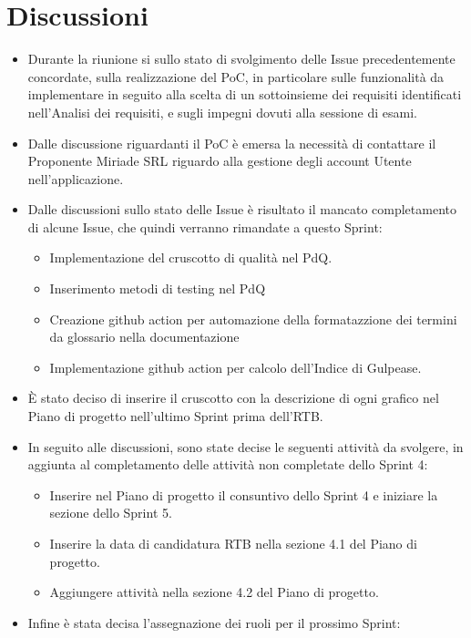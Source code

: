 \documentclass[a4paper,12pt]{article}
\begin{document}
\section{Discussioni}
\begin{itemize}
    \item Durante la riunione si sullo stato di svolgimento delle Issue precedentemente concordate, sulla realizzazione del PoC, in particolare sulle funzionalità da implementare in seguito alla scelta di un sottoinsieme dei requisiti identificati nell'Analisi dei requisiti, e sugli impegni dovuti alla sessione di esami.
    \item Dalle discussione riguardanti il PoC è emersa la necessità di contattare il Proponente Miriade SRL riguardo alla gestione degli account Utente nell'applicazione.
    \item Dalle discussioni sullo stato delle Issue è risultato il mancato completamento di alcune Issue, che quindi verranno rimandate a questo Sprint: 
    \begin{itemize}
        \item Implementazione del cruscotto di qualità nel PdQ.
        \item Inserimento metodi di testing nel PdQ
        \item Creazione github action per automazione della formatazzione dei termini da glossario nella documentazione
        \item Implementazione github action per calcolo dell'Indice di Gulpease.
    \end{itemize}
    \item È stato deciso di inserire il cruscotto con la descrizione di ogni grafico nel Piano di progetto nell'ultimo Sprint prima dell'RTB.
    \item In seguito alle discussioni, sono state decise le seguenti attività da svolgere, in aggiunta al completamento delle attività non completate dello Sprint 4:
    \begin{itemize}
        \item Inserire nel Piano di progetto il consuntivo dello Sprint 4 e iniziare la sezione dello Sprint 5.
        \item Inserire la data di candidatura RTB nella sezione 4.1 del Piano di progetto.
        \item Aggiungere attività nella sezione 4.2 del Piano di progetto.
    \end{itemize}
    \item Infine è stata decisa l'assegnazione dei ruoli per il prossimo Sprint:

\end{itemize}
\end{document}
